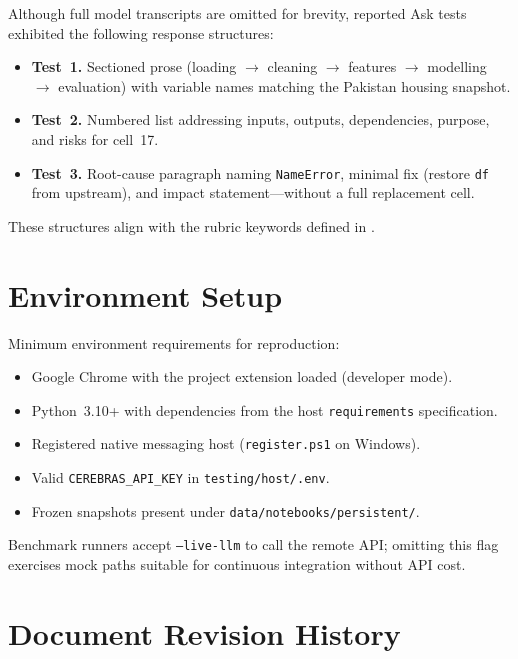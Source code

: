 Although full model transcripts are omitted for brevity, reported Ask tests exhibited the following response structures:

\begin{itemize}
  \item \textbf{Test~1.} Sectioned prose (loading $\rightarrow$ cleaning $\rightarrow$ features $\rightarrow$ modelling $\rightarrow$ evaluation) with variable names matching the Pakistan housing snapshot.
  \item \textbf{Test~2.} Numbered list addressing inputs, outputs, dependencies, purpose, and risks for cell~17.
  \item \textbf{Test~3.} Root-cause paragraph naming \texttt{NameError}, minimal fix (restore \texttt{df} from upstream), and impact statement---without a full replacement cell.
\end{itemize}

These structures align with the rubric keywords defined in {\ttfamily{}}.
\vspace{-4pt}

\section{Environment Setup}
\label{app:env}

Minimum environment requirements for reproduction:

\begin{itemize}
\setlength{\itemsep}{2pt}
  \item Google Chrome with the project extension loaded (developer mode).
  \item Python~3.10+ with dependencies from the host \texttt{requirements} specification.
  \item Registered native messaging host (\texttt{register.ps1} on Windows).
  \item Valid \texttt{CEREBRAS\_API\_KEY} in \texttt{testing/host/.env}.
\pagebreak[4]
  \item Frozen snapshots present under \texttt{data/notebooks/persistent/}.
\end{itemize}

Benchmark runners accept \texttt{--live-llm} to call the remote API; omitting this flag exercises mock paths suitable for continuous integration without API cost.

\section{Document Revision History}
\label{app:revision}

